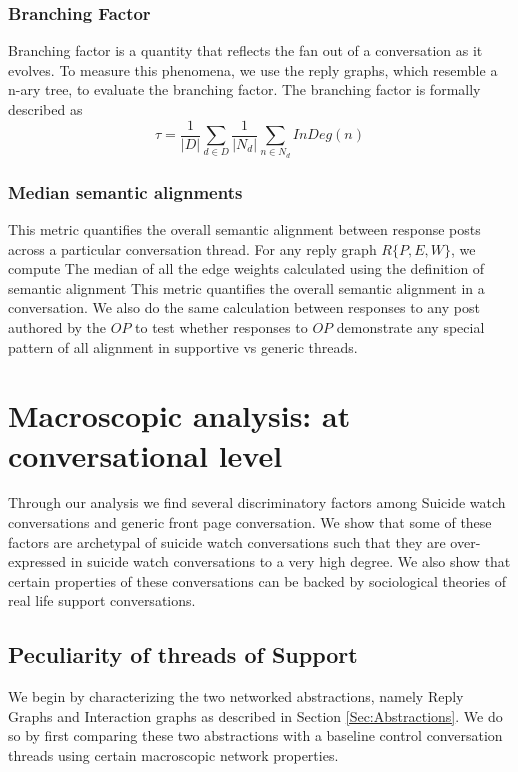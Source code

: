 \subsubsection{Branching Factor}
\label{Sec:Branching}
Branching factor is a quantity that reflects the fan out of a conversation as it evolves.
To measure this phenomena, we use the reply graphs, which resemble a n-ary tree, to evaluate the branching factor. The branching factor is formally described as 
$$\tau = \frac{1}{|D|} \sum_{d \in D}^{} \frac{1}{|N_d|} \sum_{n\in N_d}^{} \textit{InDeg}(n)$$

\subsubsection{Median semantic alignments}
\label{Sec:Semantic_alignment}
This metric quantifies the overall semantic alignment between response posts across a particular conversation thread. For any reply graph $R\{P,E,W\}$, we compute The median of all the edge weights calculated using the definition of semantic alignment 
This metric quantifies the overall semantic alignment in a conversation. We also do the same calculation between responses to any post authored by the $OP$ to test whether responses to $OP$ demonstrate any special pattern of all alignment in supportive vs generic threads.



\section{Macroscopic analysis: at conversational level}

Through our analysis we find several discriminatory factors among Suicide watch conversations and generic front page conversation. We show that some of these factors are archetypal of suicide watch conversations such that they are over-expressed in suicide watch conversations to a very high degree. We also show that certain properties of these conversations can be backed by sociological theories of real life support conversations. 

\subsection{Peculiarity of threads of Support}
We begin by characterizing the two networked abstractions, namely Reply Graphs and Interaction graphs as described in Section \ref{Sec:Abstractions}. We do so by first comparing these two abstractions with a baseline control conversation threads using certain macroscopic network properties. 

